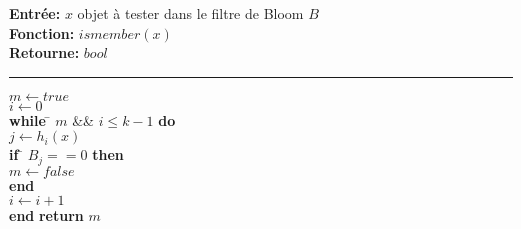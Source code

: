 \begin{flushleft}
	\begin{framed}
		\textbf{Entrée:} $x$ objet à tester dans le filtre de Bloom $B$\\
		\textbf{Fonction:} $ismember(x)$\\
		\textbf{Retourne:} $bool$

		\noindent\rule{\linewidth}{0.5pt}

		\begin{tabbing}
			$m \leftarrow true$\\
			$i \leftarrow 0$\\
			\textbf{while} \= $m$ \&\& $i \leq k - 1$ \textbf{do}\\
					\> $j \leftarrow h_i(x)$\\
					\> \textbf{if} \= $B_j == 0$ \textbf{then}\\
					\> \> $m \leftarrow false$\\
					\> \textbf{end}\\
					\> $i \leftarrow i + 1$\\
			\textbf{end}
			\textbf{return} $m$\\
	    	\end{tabbing}		
	\end{framed}
\end{flushleft}	
	
	
	
	
	
	
	
	
	
	
	
	
	
	
	
	
	
	
	
	
	